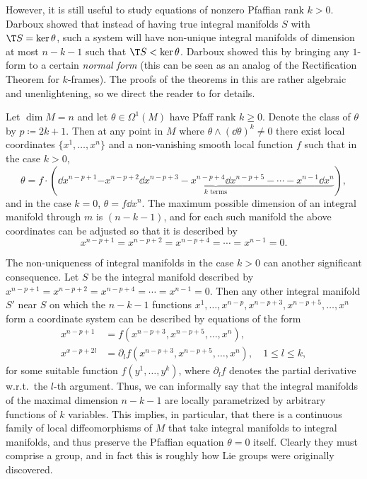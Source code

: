 However, it is still useful to study equations of nonzero Pfaffian rank $k>0$. Darboux showed that instead of having true integral manifolds $S$ with $\T S=\ker\theta$, such a system will have non-unique integral manifolds of dimension at most $n-k-1$ such that $\T S<\ker\theta$. Darboux showed this by bringing any $1$-form to a certain \emph{normal form} (this can be seen as an analog of the Rectification Theorem for $k$-frames). The proofs of the theorems in this \sect{} are rather algebraic and unenlightening, so we direct the reader to \cite{Bryant} for details.

\begin{thm}
    Let $\dim M=n$ and let $\theta\in\Omega^1(M)$ have Pfaff rank $k\geq 0$. Denote the class of $\theta$ by $p\coloneqq 2k+1$. Then at any point in $M$ where $\theta\wedge(\dd\theta)^k\neq 0$ there exist local coordinates $\{x^1,\ldots,x^n\}$ and a non-vanishing smooth local function $f$ such that in the case $k>0$,
    \[\theta=f\cdot (\dd x^{n-p+1}\underbrace{-x^{n-p+2}\dd x^{n-p+3}-x^{n-p+4}\dd x^{n-p+5}-\cdots -x^{n-1}\dd x^n}_{k\text{ terms}}),\]
    and in the case $k=0$, $\theta=f \dd x^n$. The maximum possible dimension of an integral manifold through $m$ is $(n-k-1)$, and for each such manifold the above coordinates can be adjusted so that it is described by 
    \[x^{n-p+1}=x^{n-p+2}=x^{n-p+4}=\cdots=x^{n-1}=0.\]
\end{thm}

The non-uniqueness of integral manifolds in the case $k>0$ can another significant consequence. Let $S$ be the integral manifold described by $x^{n-p+1}=x^{n-p+2}=x^{n-p+4}=\cdots=x^{n-1}=0$. Then any other integral manifold $S'$ near $S$ on which the $n-k-1$ functions $x^1,\ldots,x^{n-p},x^{n-p+3},x^{n-p+5},\ldots,x^n$ form a coordinate system can be described by equations of the form 
\begin{align}
    x^{n-p+1}&=f(x^{n-p+3},x^{n-p+5},\ldots,x^{n}),\\
    x^{x-p+2l}&=\partial_l f(x^{n-p+3},x^{n-p+5},\ldots,x^{n}),\quad 1\leq l\leq k,
\end{align}
for some suitable function $f(y^1,\ldots,y^k)$, where $\partial_l f$ denotes the partial derivative w.r.t.\ the $l$-th argument. Thus, we can informally say that the integral manifolds of the maximal dimension $n-k-1$ are locally parametrized by arbitrary functions of $k$ variables. This implies, in particular, that there is a continuous family of local diffeomorphisms of $M$ that take integral manifolds to integral manifolds, and thus preserve the Pfaffian equation $\theta=0$ itself. Clearly they must comprise a group, and in fact this is roughly how Lie groups were originally discovered.

